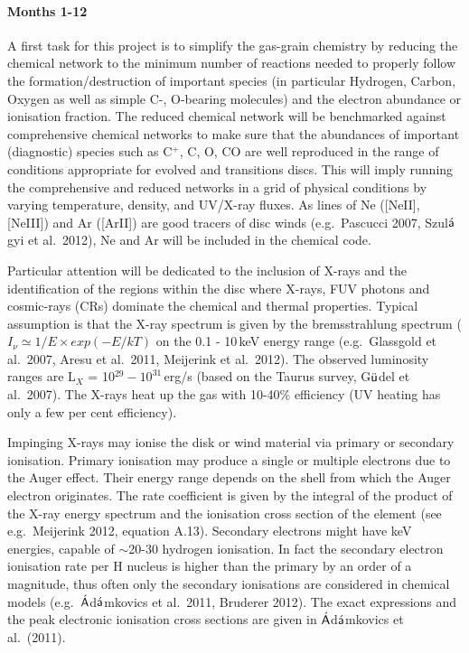 \documentclass[10pt,fleqn,twoside]{article}
\begin{document}
\paragraph{Months 1-12}

 A first task for this project is to simplify the gas-grain chemistry by reducing the chemical network to the minimum number of reactions needed to properly follow the formation/destruction of important species (in particular Hydrogen, Carbon, Oxygen as well as simple C-, O-bearing molecules) and the electron abundance or ionisation fraction. 
The reduced chemical network will be benchmarked against comprehensive chemical networks to make sure that the abundances of  important (diagnostic) species such as C$^+$, C, O, CO are well reproduced in the range of conditions appropriate for evolved and
transitions discs. This will imply running the comprehensive and reduced networks in a grid of physical conditions by varying temperature, density, and UV/X-ray fluxes.  As lines of Ne ([NeII], [NeIII]) and Ar ([ArII]) are good tracers of disc winds (e.g.\ Pascucci 2007, Szul$\acute{\textsf a}$gyi et al.\ 2012), Ne and Ar will be included in the chemical code. 

Particular attention will be dedicated to the inclusion of X-rays and the identification of the regions within the disc where X-rays, FUV photons and cosmic-rays (CRs) dominate the chemical and thermal properties. Typical assumption is that the X-ray spectrum is given by the bremsstrahlung spectrum ($I_{\nu} \simeq 1/E \times exp(-E/kT)$ on the 0.1 - 10\,keV energy range (e.g.\ Glassgold et al.\ 2007, Aresu et al.\ 2011, Meijerink et al.\ 2012). The observed luminosity ranges are L$_X$ = 10$^{29} - 10^{31}$\,erg/s (based on the Taurus survey, G$\ddot{\textsf u}$del et al.\ 2007). The X-rays heat up the gas with 10-40\% efficiency (UV heating has only a few per cent efficiency). 

Impinging X-rays may ionise the disk or wind material via primary or secondary ionisation. Primary ionisation may produce a single or multiple electrons due to the Auger effect. Their energy range depends on the shell from which  the Auger electron originates. The rate coefficient is given by the integral of the product of the X-ray energy spectrum and the ionisation cross section of the element (see e.g.\ Meijerink 2012, equation A.13). Secondary electrons might have keV energies, capable of $\sim$20-30 hydrogen ionisation. In fact the secondary electron ionisation rate per H nucleus is higher than the primary by an order of a magnitude, thus often only the secondary ionisations are considered in chemical models (e.g.\ $\acute{\textsf A}$d$\acute{\textsf a}$mkovics et al.\ 2011, Bruderer 2012).
The exact expressions and the peak electronic ionisation cross sections are given in $\acute{\textsf A}$d$\acute{\textsf a}$mkovics et al.\ (2011). 
\end{document}
